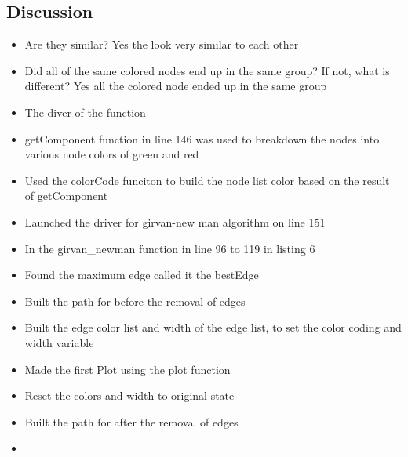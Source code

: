 \documentclass[12pt]{article}
\begin{document}
\subsection*{Discussion}

    \begin{itemize}
        \item Are they similar?
        Yes the look very similar to each other 
         \item Did all of the same colored nodes end up in the same group? If not, what is different?
         Yes all the colored node ended up in the same group
         \item The diver of the function
         
         \item getComponent function in line 146 was used to breakdown the nodes into various node colors of green and red
         
         \item Used the colorCode funciton to build the node list color based on the result of getComponent
         \item Launched the driver for girvan-new man algorithm on line 151
         
         
        \item In the girvan\_newman function in line 96 to 119 in listing 6
        
        \item Found the maximum edge called it the bestEdge
        
        \item Built the path for before the removal of edges
        \item Built the edge color list and width of the edge list, to set the color coding and width variable
         
        \item Made the first Plot using the plot function 
        \item Reset the colors and width to original state
        \item Built the path for after the removal of edges
        \item 
        
    \end{itemize}
    
\end{document}
